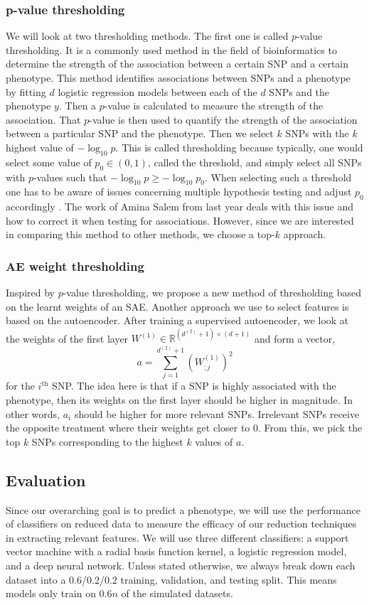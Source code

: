 \documentclass{article}
\begin{document}
\subsubsection{p-value thresholding}
We will look at two thresholding methods. The first one is called $p$-value thresholding. It is a commonly used method in the field of bioinformatics to determine the strength of the association between a certain SNP and a certain phenotype. This method identifies associations between SNPs and a phenotype by fitting $d$ logistic regression models between each of the $d$ SNPs and the phenotype $y.$ Then a $p$-value is calculated to measure the strength of the association. That $p$-value is then used to quantify the strength of the association between a particular SNP and the phenotype. Then we select $k$ SNPs with the $k$ highest value of $-\log_{10}p.$ This is called thresholding because typically, one would select some value of $p_0 \in (0,1)$, called the threshold, and simply select all SNPs with $p$-values such that $-\log_{10}p \geq -\log_{10}p_0.$ When selecting such a threshold one has to be aware of issues concerning multiple hypothesis testing and adjust $p_0$ accordingly \cite{bonferroni}. The work of Amina Salem from last year deals with this issue and how to correct it when testing for associations. However, since we are interested in comparing this method to other methods, we choose a top-$k$ approach.
\subsubsection{AE weight thresholding}
Inspired by $p$-value thresholding, we propose a new method of thresholding based on the learnt weights of an SAE. Another approach we use to select features is based on the autoencoder. After training a supervised autoencoder, we look at the weights of the first layer $W^{(1)} \in \mathbb R ^ {(d^{(2)} + 1) \times (d+1)}$ and form a vector,
\[
a = \sum_{j=1}^{d^{(2)} + 1} \left(W^{(1)}_{;j}\right)^2  
\]
for the $i^{\text{th}}$ SNP. The idea here is that if a SNP is highly associated with the phenotype, then its weights on the first layer should be higher in magnitude. In other words, $a_i$ should be higher for more relevant SNPs. Irrelevant SNPs receive the opposite treatment where their weights get closer to 0. From this, we pick the top $k$ SNPs corresponding to the highest $k$ values of $a.$

\subsection{Evaluation} \label{method_eval}
Since our overarching goal is to predict a phenotype, we will use the performance of classifiers on reduced data to measure the efficacy of our reduction techniques in extracting relevant features. We will use three different classifiers: a support vector machine \cite{islr} with a radial basis function kernel, a logistic regression model, and a deep neural network. Unless stated otherwise, we always break down each dataset into a 0.6/0.2/0.2 training, validation, and testing split. This means models only train on $0.6n$ of the simulated datasets.   
\end{document}
